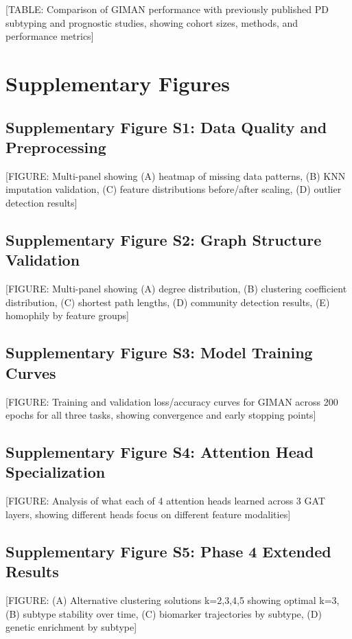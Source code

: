 \documentclass[11pt]{article}
\begin{document}
[TABLE: Comparison of GIMAN performance with previously published PD subtyping and prognostic studies, showing cohort sizes, methods, and performance metrics]

\section{Supplementary Figures}

\subsection{Supplementary Figure S1: Data Quality and Preprocessing}

[FIGURE: Multi-panel showing (A) heatmap of missing data patterns, (B) KNN imputation validation, (C) feature distributions before/after scaling, (D) outlier detection results]

\subsection{Supplementary Figure S2: Graph Structure Validation}

[FIGURE: Multi-panel showing (A) degree distribution, (B) clustering coefficient distribution, (C) shortest path lengths, (D) community detection results, (E) homophily by feature groups]

\subsection{Supplementary Figure S3: Model Training Curves}

[FIGURE: Training and validation loss/accuracy curves for GIMAN across 200 epochs for all three tasks, showing convergence and early stopping points]

\subsection{Supplementary Figure S4: Attention Head Specialization}

[FIGURE: Analysis of what each of 4 attention heads learned across 3 GAT layers, showing different heads focus on different feature modalities]

\subsection{Supplementary Figure S5: Phase 4 Extended Results}

[FIGURE: (A) Alternative clustering solutions k=2,3,4,5 showing optimal k=3, (B) subtype stability over time, (C) biomarker trajectories by subtype, (D) genetic enrichment by subtype]
\end{document}

